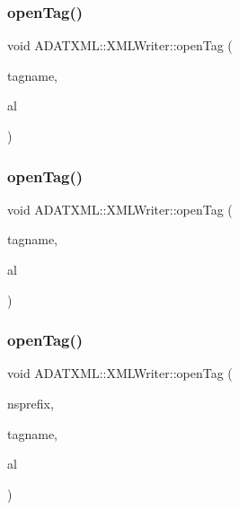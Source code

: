\mbox{\label{classADATXML_1_1XMLWriter_a0d90742225631452502c6716ee737fef}} 
\subsubsection{\texorpdfstring{openTag()}{openTag()}\hspace{0.1cm}{\footnotesize\ttfamily [5/8]}}
{\footnotesize\ttfamily void A\+D\+A\+T\+X\+M\+L\+::\+X\+M\+L\+Writer\+::open\+Tag (\begin{DoxyParamCaption}\item[{const std\+::string \&}]{tagname,  }\item[{\mbox{\hyperlink{namespaceXMLWriterAPI_a28cf3d8051a4ccf0aef208b7ebc66d07}{X\+M\+L\+Writer\+A\+P\+I\+::\+Attribute\+List}} \&}]{al }\end{DoxyParamCaption})}

\mbox{\label{classADATXML_1_1XMLWriter_a0d90742225631452502c6716ee737fef}} 
\subsubsection{\texorpdfstring{openTag()}{openTag()}\hspace{0.1cm}{\footnotesize\ttfamily [6/8]}}
{\footnotesize\ttfamily void A\+D\+A\+T\+X\+M\+L\+::\+X\+M\+L\+Writer\+::open\+Tag (\begin{DoxyParamCaption}\item[{const std\+::string \&}]{tagname,  }\item[{\mbox{\hyperlink{namespaceXMLWriterAPI_a28cf3d8051a4ccf0aef208b7ebc66d07}{X\+M\+L\+Writer\+A\+P\+I\+::\+Attribute\+List}} \&}]{al }\end{DoxyParamCaption})}

\mbox{\label{classADATXML_1_1XMLWriter_a26795936be9ebee12c374fa82065ffb5}} 
\subsubsection{\texorpdfstring{openTag()}{openTag()}\hspace{0.1cm}{\footnotesize\ttfamily [7/8]}}
{\footnotesize\ttfamily void A\+D\+A\+T\+X\+M\+L\+::\+X\+M\+L\+Writer\+::open\+Tag (\begin{DoxyParamCaption}\item[{const std\+::string \&}]{nsprefix,  }\item[{const std\+::string \&}]{tagname,  }\item[{\mbox{\hyperlink{namespaceXMLWriterAPI_a28cf3d8051a4ccf0aef208b7ebc66d07}{X\+M\+L\+Writer\+A\+P\+I\+::\+Attribute\+List}} \&}]{al }\end{DoxyParamCaption})}

